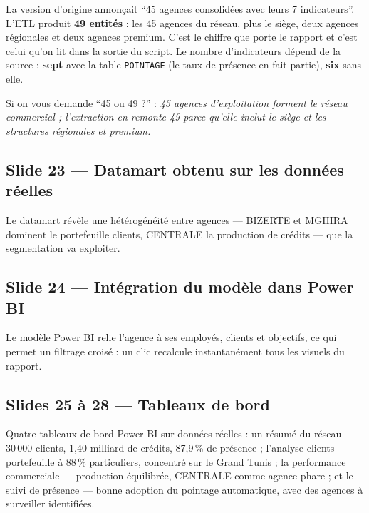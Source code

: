 \documentclass[a4paper,11pt]{article}
\begin{document}
\begin{corrige}
La version d'origine annonçait \enquote{45 agences consolidées avec leurs
7 indicateurs}. L'ETL produit \textbf{49 entités} : les 45 agences du réseau,
plus le siège, deux agences régionales et deux agences premium. C'est le chiffre
que porte le rapport et c'est celui qu'on lit dans la sortie du script. Le
nombre d'indicateurs dépend de la source : \textbf{sept} avec la table
\texttt{POINTAGE} (le taux de présence en fait partie), \textbf{six} sans elle.
\end{corrige}

\begin{note}
\small Si on vous demande \enquote{45 ou 49 ?} : \emph{45 agences
d'exploitation forment le réseau commercial ; l'extraction en remonte 49 parce
qu'elle inclut le siège et les structures régionales et premium.}
\end{note}

\subsection*{Slide 23 --- Datamart obtenu sur les données réelles}

Le datamart révèle une hétérogénéité entre agences --- BIZERTE et MGHIRA
dominent le portefeuille clients, CENTRALE la production de crédits --- que la
segmentation va exploiter.

\subsection*{Slide 24 --- Intégration du modèle dans Power BI}

Le modèle Power BI relie l'agence à ses employés, clients et objectifs, ce qui
permet un filtrage croisé : un clic recalcule instantanément tous les visuels du
rapport.

\subsection*{Slides 25 à 28 --- Tableaux de bord}

Quatre tableaux de bord Power BI sur données réelles : un résumé du réseau ---
30\,000 clients, 1,40 milliard de crédits, 87,9\,\% de présence ; l'analyse
clients --- portefeuille à 88\,\% particuliers, concentré sur le Grand Tunis ;
la performance commerciale --- production équilibrée, CENTRALE comme agence
phare ; et le suivi de présence --- bonne adoption du pointage automatique, avec
des agences à surveiller identifiées.
\end{document}
